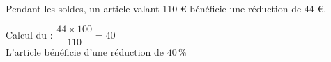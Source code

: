 \begin{myex}
	Pendant les soldes, un article valant 110 € bénéficie une réduction de 44 €.
	
	Calcul du  : $\dfrac{44 \times 100}{110} = 40$\\
	
	L'article bénéficie d'une réduction de $40\,\%$
\end{myex}